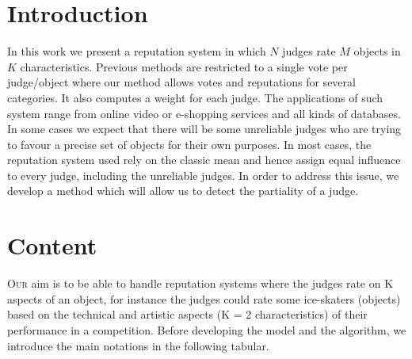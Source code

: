 \documentclass[9pt]{SelfArx} %
\begin{document}
\flushbottom %

\maketitle %

\thispagestyle{empty} %


\section*{Introduction}
In this work we present a reputation system in which $N$ judges rate $M$ objects in $K$ characteristics. Previous methods are restricted to a single vote per judge/object where our method allows votes and reputations for several categories.
It also computes a weight for each judge. The applications of such system range from online video or e-shopping services and all kinds of databases. In some cases we expect that there will be some unreliable judges who are trying to favour a precise set of objects for their own purposes. In most cases, the reputation system used rely on the classic mean and hence assign equal influence to every judge, including the unreliable judges. In order to address this issue, we develop a method which will allow us to detect the partiality of a judge. 

\section*{Content}

\lettrine[lines=2]{O}{ur} aim is to be able to handle reputation systems where the judges rate on K aspects of an object, for instance the judges could rate some ice-skaters (objects) based on the technical and artistic aspects (K = 2 characteristics) of their performance in a competition. Before developing the model and the algorithm, we introduce the main notations in the following tabular.
\end{document}
